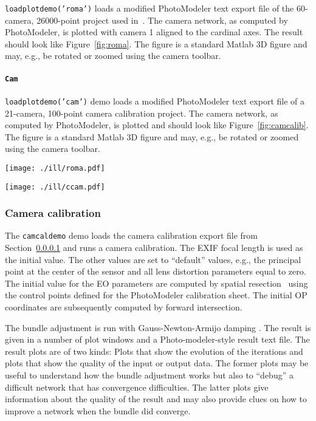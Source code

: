 \documentclass{article}
\begin{document}
\texttt{loadplotdemo('roma')} loads a modified PhotoModeler text export file
of the 60-camera, 26000-point project used
in~\citet{Borlin2013:Bundle}. The camera network, as computed by
PhotoModeler, is plotted with camera 1 aligned to the cardinal axes.
The result should look like Figure~\ref{fig:roma}. The figure is a
standard Matlab 3D figure and may, e.g., be rotated or zoomed using
the camera toolbar.

\paragraph{\texttt{Cam}}
\label{sec:camcaldata}
\texttt{loadplotdemo('cam')} demo loads a modified PhotoModeler text export
file of a 21-camera, 100-point camera calibration project. The camera
network, as computed by PhotoModeler, is plotted and should look like
Figure~\ref{fig:camcalib}. The figure is a standard Matlab 3D figure and
may, e.g., be rotated or zoomed using the camera toolbar.


\begin{figure*}[tbp]
\centering
\texttt{[image: ./ill/roma.pdf]}
\caption{\label{fig:roma}The figure generated by the \texttt{loadplotdemo} demo.}
\end{figure*}

\begin{figure*}[tbp]
\centering
\texttt{[image: ./ill/ccam.pdf]}
\caption{\label{fig:camcalib}The figure generated by the \texttt{loadplotdemo('cam')} demo.}
\end{figure*}

\subsubsection{Camera calibration}
\label{sec:org19753c2}

The \texttt{camcaldemo} demo loads the camera calibration export file from
Section~\ref{sec:camcaldata} and runs a camera calibration. The
EXIF focal length is used as the initial value. The other values are
set to ``default'' values, e.g., the principal point at the center of
the sensor and all lens distortion parameters equal to zero. The
initial value for the EO parameters are computed by spatial
resection~\citep[Chap.~11.1.3.4]{Haralick1994:Review,McGlone2004:Manual}
using the control points defined for the PhotoModeler calibration
sheet. The initial OP coordinates are subsequently computed by forward
intersection.

The bundle adjustment is run with Gauss-Newton-Armijo damping
\citep{Borlin2013:Bundle}. The result is given in a number of plot
windows and a Photo-modeler-style result text file. The result plots
are of two kinds: Plots that show the evolution of the iterations and
plots that show the quality of the input or output data. The former
plots may be useful to understand how the bundle adjustment works but
also to ``debug'' a difficult network that has convergence
difficulties. The latter plots give information about the quality of
the result and may also provide clues on how to improve a network when
the bundle did converge.
\end{document}
